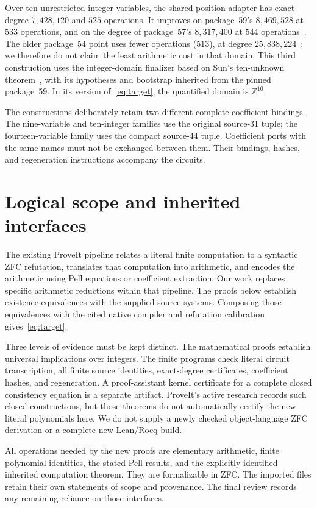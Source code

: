 \documentclass[11pt,a4paper]{article}
\newcommand{\Z}{\mathbb Z}
\theoremstyle{definition}\newtheorem{definition}[theorem]{Definition}
\theoremstyle{remark}\newtheorem{remark}[theorem]{Remark}
\begin{document}
Over ten unrestricted integer variables, the shared-position adapter has
exact degree $7{,}428{,}120$ and $525$ operations. It improves on package~59's
$8{,}469{,}528$ at $533$ operations, and on the degree of package~57's
$8{,}317{,}400$ at $544$ operations~\cite{p57,p59}. The older package~54
point uses fewer operations ($513$), at degree $25{,}838{,}224$~\cite{p54}; we therefore
do not claim the least arithmetic cost in that domain. This third
construction uses the integer-domain finalizer based on Sun's
ten-unknown theorem~\cite{sun}, with its hypotheses and bootstrap inherited
from the pinned package~59. In its version of~\eqref{eq:target}, the
quantified domain is $\Z^{10}$.

The constructions deliberately retain two different complete coefficient
bindings. The nine-variable and ten-integer families use the original source-31 tuple;
the fourteen-variable family uses the compact source-44 tuple. Coefficient
ports with the same names must not be exchanged between them. Their
bindings, hashes, and regeneration instructions accompany the circuits.

\section{Logical scope and inherited interfaces}
\label{sec:scope}
The existing ProveIt pipeline relates a literal finite computation to a
syntactic ZFC refutation, translates that computation into arithmetic,
and encodes the arithmetic using Pell equations or coefficient extraction.
Our work replaces specific arithmetic reductions within that pipeline.
The proofs below establish existence equivalences with the supplied source
systems. Composing those equivalences with the cited native compiler and
refutation calibration gives~\eqref{eq:target}.

Three levels of evidence must be kept distinct. The mathematical proofs
establish universal implications over integers. The finite programs check
literal circuit transcription, all finite source identities, exact-degree
certificates, coefficient hashes, and regeneration. A proof-assistant
kernel certificate for a complete closed consistency equation is a
separate artifact. ProveIt's active research records such closed
constructions, but those theorems do not automatically certify the new
literal polynomials here. We do not supply a newly checked object-language
ZFC derivation or a complete new Lean/Rocq build.

All operations needed by the new proofs are elementary arithmetic,
finite polynomial identities, the stated Pell results, and the explicitly
identified inherited computation theorem. They are formalizable in ZFC.
The imported files retain their own statements of scope and provenance.
The final review records any remaining reliance on those interfaces.
\end{document}
